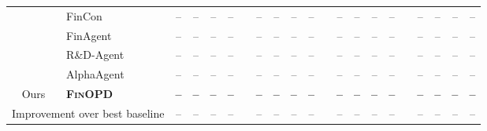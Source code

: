 \begin{table}[t]
\begin{threeparttable}
{\begin{tabular}{clcccclcccclcccclcccc}
& FinCon & -- & -- & -- & -- && -- & -- & -- & -- && -- & -- & -- & -- && -- & -- & -- & -- \\
& FinAgent & -- & -- & -- & -- && -- & -- & -- & -- && -- & -- & -- & -- && -- & -- & -- & -- \\
& R\&D-Agent & -- & -- & -- & -- && -- & -- & -- & -- && -- & -- & -- & -- && -- & -- & -- & -- \\
& AlphaAgent & -- & -- & -- & -- && -- & -- & -- & -- && -- & -- & -- & -- && -- & -- & -- & -- \\
\midrule
\multirow{1}{*}{Ours}
& \textbf{\textsc{FinOPD}} & \textbf{\textcolor{FBest}{--}} & \textbf{\textcolor{FBest}{--}} & \textbf{\textcolor{FBest}{--}} & \textbf{\textcolor{FBest}{--}} && \textbf{\textcolor{FBest}{--}} & \textbf{\textcolor{FBest}{--}} & \textbf{\textcolor{FBest}{--}} & \textbf{\textcolor{FBest}{--}} && \textbf{\textcolor{FBest}{--}} & \textbf{\textcolor{FBest}{--}} & \textbf{\textcolor{FBest}{--}} & \textbf{\textcolor{FBest}{--}} && \textbf{\textcolor{FBest}{--}} & \textbf{\textcolor{FBest}{--}} & \textbf{\textcolor{FBest}{--}} & \textbf{\textcolor{FBest}{--}} \\
\midrule
\multicolumn{2}{c}{Improvement over best baseline}
& -- & -- & -- & -- && -- & -- & -- & -- && -- & -- & -- & -- && -- & -- & -- & -- \\
\bottomrule
\end{tabular}
}
\end{threeparttable}
\label{tab:per_asset}
\end{table}
